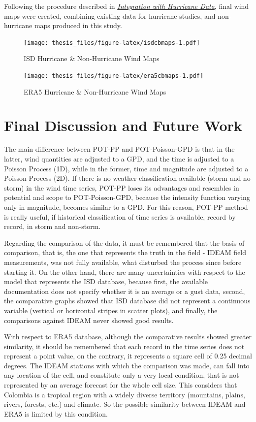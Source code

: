\documentclass[12pt,twoside]{reedthesis}
\begin{document}
Following the procedure described in \emph{\protect\hyperlink{integration}{Integration with Hurricane Data}}, final wind maps were created, combining existing data for hurricane studies, and non-hurricane maps produced in this study.
\begin{figure}
\centering
\texttt{[image: thesis\_files/figure-latex/isdcbmaps-1.pdf]}
\caption{\label{fig:isdcbmaps}ISD Hurricane \& Non-Hurricane Wind Maps}
\end{figure}
\begin{figure}
\centering
\texttt{[image: thesis\_files/figure-latex/era5cbmaps-1.pdf]}
\caption{\label{fig:era5cbmaps}ERA5 Hurricane \& Non-Hurricane Wind Maps}
\end{figure}
\hypertarget{fd}{%
\section{Final Discussion and Future Work}\label{fd}}

The main difference between POT-PP and POT-Poisson-GPD is that in the latter, wind quantities are adjusted to a GPD, and the time is adjusted to a Poisson Process (1D), while in the former, time and magnitude are adjusted to a Poisson Process (2D). If there is no weather classification available (storm and no storm) in the wind time series, POT-PP loses its advantages and resembles in potential and scope to POT-Poisson-GPD, because the intensity function varying only in magnitude, becomes similar to a GPD. For this reason, POT-PP method is really useful, if historical classification of time series is available, record by record, in storm and non-storm.

Regarding the comparison of the data, it must be remembered that the basis of comparison, that is, the one that represents the truth in the field - IDEAM field measurements, was not fully available, what disturbed the process since before starting it. On the other hand, there are many uncertainties with respect to the model that represents the ISD database, because first, the available documentation does not specify whether it is an average or a gust data, second, the comparative graphs showed that ISD database did not represent a continuous variable (vertical or horizontal stripes in scatter plots), and finally, the comparisons against IDEAM never showed good results.

With respect to ERA5 database, although the comparative results showed greater similarity, it should be remembered that each record in the time series does not represent a point value, on the contrary, it represents a square cell of 0.25 decimal degrees. The IDEAM stations with which the comparison was made, can fall into any location of the cell, and constitute only a very local condition, that is not represented by an average forecast for the whole cell size. This considers that Colombia is a tropical region with a widely diverse territory (mountains, plains, rivers, forests, etc.) and climate. So the possible similarity between IDEAM and ERA5 is limited by this condition.
\end{document}
